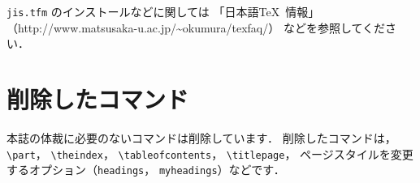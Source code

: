 \documentclass[technicalreport]{ieicej}
\begin{document}
\texttt{jis.tfm} のインストールなどに関しては
「日本語\TeX\ 情報」
（http://www.matsusaka-u.ac.jp\slash{}\~{}okumura\slash{}texfaq\slash{}）
などを参照してください．

\section{削除したコマンド}

本誌の体裁に必要のないコマンドは削除しています．
削除したコマンドは，\verb/\part/，\allowbreak
\verb/\theindex/，\allowbreak
\verb/\tableofcontents/，\allowbreak
\verb/\titlepage/，\allowbreak
ページスタイルを変更するオプション（\texttt{headings}，
\texttt{myheadings}）などです．
\end{document}
